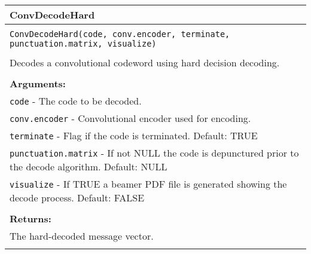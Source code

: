 \begin{longtable}{|p{\textwidth}|}
\hline
\rowcolor{lightblue}ConvDecodeHard\\
\hline
\\
\texttt{ConvDecodeHard(code, conv.encoder, terminate, punctuation.matrix, visualize)}\\
\\
Decodes a convolutional codeword using hard decision decoding.\\
\\
\textbf{Arguments:}\\
\texttt{code} - The code to be decoded.\\
\texttt{conv.encoder} - Convolutional encoder used for encoding.\\
\texttt{terminate} - Flag if the code is terminated. Default: TRUE\\
\texttt{punctuation.matrix} - If not NULL the code is depunctured prior to the decode algorithm. Default: NULL\\
\texttt{visualize} - If TRUE a beamer PDF file is generated showing the decode process. Default: FALSE\\
\\
\textbf{Returns:}\\
The hard-decoded message vector.\\
\\
\hline
\end{longtable}